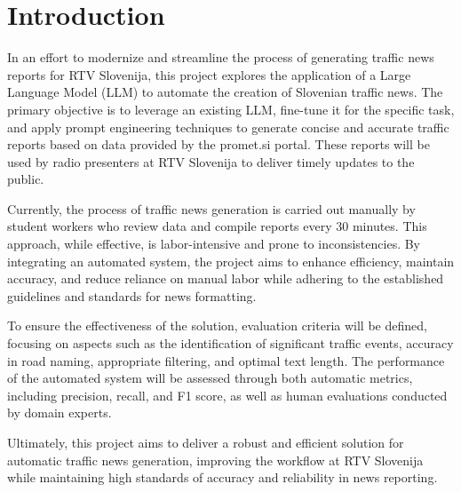 \documentclass[fleqn,moreauthors,10pt]{ds_report}
\affiliation{\textit{Advisors: Slavko Žitnik}}
\begin{document}
\flushbottom 

\maketitle 

\thispagestyle{empty} 


\section*{Introduction}
In an effort to modernize and streamline the process of generating traffic news reports for RTV Slovenija, this project explores the application of a Large Language Model (LLM) to automate the creation of Slovenian traffic news. The primary objective is to leverage an existing LLM, fine-tune it for the specific task, and apply prompt engineering techniques to generate concise and accurate traffic reports based on data provided by the promet.si portal. These reports will be used by radio presenters at RTV Slovenija to deliver timely updates to the public.

Currently, the process of traffic news generation is carried out manually by student workers who review data and compile reports every 30 minutes. This approach, while effective, is labor-intensive and prone to inconsistencies. By integrating an automated system, the project aims to enhance efficiency, maintain accuracy, and reduce reliance on manual labor while adhering to the established guidelines and standards for news formatting.

To ensure the effectiveness of the solution, evaluation criteria will be defined, focusing on aspects such as the identification of significant traffic events, accuracy in road naming, appropriate filtering, and optimal text length. The performance of the automated system will be assessed through both automatic metrics, including precision, recall, and F1 score, as well as human evaluations conducted by domain experts.

Ultimately, this project aims to deliver a robust and efficient solution for automatic traffic news generation, improving the workflow at RTV Slovenija while maintaining high standards of accuracy and reliability in news reporting.
\end{document}
